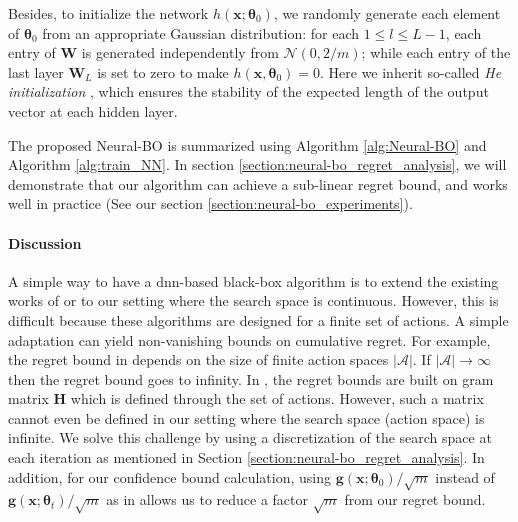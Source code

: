 
Besides, to initialize the network $h(\mathbf{x}; \boldsymbol{\theta}_0)$, we randomly generate each element of $\boldsymbol{\theta}_0$ from an appropriate Gaussian distribution: for each $1 \leq l \leq L-1$, each entry of $\mathbf{W}$ is generated independently from $\mathcal N(0, 2/m)$; while each entry of the last layer $\mathbf{W}_L$ is set to zero to make $h(\mathbf{x}, \boldsymbol{\theta}_0) = 0$. Here we inherit so-called \emph{He initialization} \citep{he2015delving}, which ensures the stability of the expected length of the output vector at each hidden layer. 

The proposed Neural-BO is summarized using Algorithm \ref{alg:Neural-BO} and Algorithm \ref{alg:train_NN}. In section \ref{section:neural-bo_regret_analysis}, we will demonstrate that our algorithm can achieve a sub-linear regret bound, and works well in practice (See our section \ref{section:neural-bo_experiments}).
\paragraph{Discussion}
A simple way to have a \ac{dnn}-based black-box algorithm is to extend the existing works of \citet{zhou2020neural,zhang2021neural} or \citet{kassraie2022neural} to our setting where the search space is continuous. However, this is difficult because these algorithms are designed for a finite set of actions. A simple adaptation can yield non-vanishing bounds on cumulative regret. For example, the regret bound in \citet{kassraie2022neural} depends on the size of finite action spaces $\lvert \mathcal A \rvert$. If $\lvert \mathcal A \rvert \rightarrow \infty$ then the regret bound goes to infinity. In \citet{zhou2020neural,zhang2021neural}, the regret bounds are built on gram matrix $\mathbf{H}$ which is defined through the set of actions. However, such a matrix cannot even be defined in our setting where the search space (action space) is infinite. We solve this challenge by using a discretization of the search space at each iteration as mentioned in Section \ref{section:neural-bo_regret_analysis}. In addition, for our confidence bound calculation, using $\mathbf{g}(\mathbf{x};\boldsymbol{\theta}_0)/\sqrt{m}$ instead of $\mathbf{g}(\mathbf{x};\boldsymbol{\theta}_t)/\sqrt{m}$ as in \citet{zhou2020neural,zhang2021neural} allows us to reduce a factor $\sqrt{m}$ from our regret bound.    

